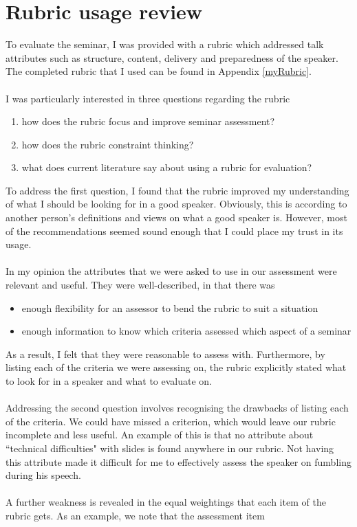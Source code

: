 \section{Rubric usage review} \label{rubReview}

To evaluate the seminar, I was provided with a rubric which addressed talk attributes such as
structure, content, delivery and preparedness of the speaker.
The completed rubric that I used can be found in Appendix \ref{myRubric}.\\
\\
I was particularly interested in three questions regarding the rubric
\begin{enumerate}
	\item how does the rubric focus and improve seminar assessment?
	\item how does the rubric constraint thinking?
	\item what does current literature say about using a rubric for evaluation?
\end{enumerate}

To address the first question, I found that the rubric improved my understanding of what I should be
looking for in a good speaker.
Obviously, this is according to another person's definitions and views on what a good speaker is.
However, most of the recommendations seemed sound enough that I could place my trust in its usage.\\
\\
In my opinion the attributes that we were asked to use in our assessment were relevant and useful.
They were well-described, in that there was
\begin{itemize}
	\item enough flexibility for an assessor to bend the rubric to suit a situation
	\item enough information to know which criteria assessed which aspect of a seminar
\end{itemize}

As a result, I felt that they were reasonable to assess with.
Furthermore, by listing each of the criteria we were assessing on, the rubric explicitly stated what
to look for in a speaker and what to evaluate on.\\
\\
Addressing the second question involves recognising the drawbacks of listing each of the criteria.
We could have missed a criterion, which would leave our rubric incomplete and less useful.
An example of this is that no attribute about ``technical difficulties" with slides is found
anywhere in our rubric.
Not having this attribute made it difficult for me to effectively assess the speaker on fumbling
during his speech.\\
\\
A further weakness is revealed in the equal weightings that each item of the rubric gets.
As an example, we note that the assessment item

